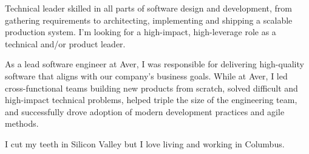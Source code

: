 

\begin{cvparagraph}

Technical leader skilled in all parts of software design and development, from gathering requirements to architecting, implementing and shipping a scalable production system.
I'm looking for a high-impact, high-leverage role as a technical and/or product leader.

As a lead software engineer at Aver, I was responsible for delivering high-quality software that aligns with our company's business goals.
While at Aver, I led cross-functional teams building new products from scratch, solved difficult and high-impact technical problems, helped triple the size of the engineering team, and successfully drove adoption of modern development practices and agile methods.

I cut my teeth in Silicon Valley but I love living and working in Columbus.

\end{cvparagraph}
